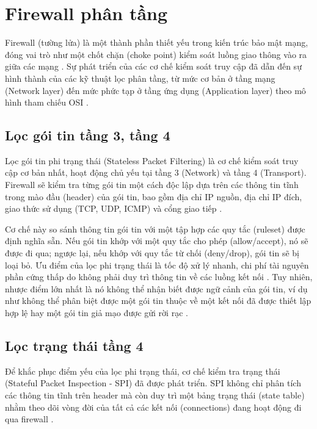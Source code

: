 \documentclass[../DoAn.tex]{subfiles}
\begin{document}
\section{Firewall phân tầng}
Firewall (tường lửa) là một thành phần thiết yếu trong kiến trúc bảo mật mạng, đóng vai trò như một chốt chặn (choke point) kiểm soát luồng giao thông vào ra giữa các mạng \cite{cheswick2003firewalls}. Sự phát triển của các cơ chế kiểm soát truy cập đã dẫn đến sự hình thành của các kỹ thuật lọc phân tầng, từ mức cơ bản ở tầng mạng (Network layer) đến mức phức tạp ở tầng ứng dụng (Application layer) theo mô hình tham chiếu OSI \cite{kurose2017computer, scarfone2009guidelines}.

\subsection{Lọc gói tin tầng 3, tầng 4}
Lọc gói tin phi trạng thái (Stateless Packet Filtering) là cơ chế kiểm soát truy cập cơ bản nhất, hoạt động chủ yếu tại tầng 3 (Network) và tầng 4 (Transport). Firewall sẽ kiểm tra từng gói tin một cách độc lập dựa trên các thông tin tĩnh trong mào đầu (header) của gói tin, bao gồm địa chỉ IP nguồn, địa chỉ IP đích, giao thức sử dụng (TCP, UDP, ICMP) và cổng giao tiếp \cite{cheswick2003firewalls}. 

Cơ chế này so sánh thông tin gói tin với một tập hợp các quy tắc (ruleset) được định nghĩa sẵn. Nếu gói tin khớp với một quy tắc cho phép (allow/accept), nó sẽ được đi qua; ngược lại, nếu khớp với quy tắc từ chối (deny/drop), gói tin sẽ bị loại bỏ. Ưu điểm của lọc phi trạng thái là tốc độ xử lý nhanh, chi phí tài nguyên phần cứng thấp do không phải duy trì thông tin về các luồng kết nối \cite{kurose2017computer}. Tuy nhiên, nhược điểm lớn nhất là nó không thể nhận biết được ngữ cảnh của gói tin, ví dụ như không thể phân biệt được một gói tin thuộc về một kết nối đã được thiết lập hợp lệ hay một gói tin giả mạo được gửi rời rạc \cite{scarfone2009guidelines}.

\subsection{Lọc trạng thái tầng 4} 
Để khắc phục điểm yếu của lọc phi trạng thái, cơ chế kiểm tra trạng thái (Stateful Packet Inspection - SPI) đã được phát triển. SPI không chỉ phân tích các thông tin tĩnh trên header mà còn duy trì một bảng trạng thái (state table) nhằm theo dõi vòng đời của tất cả các kết nối (connections) đang hoạt động đi qua firewall \cite{scarfone2009guidelines}. 
\end{document}
